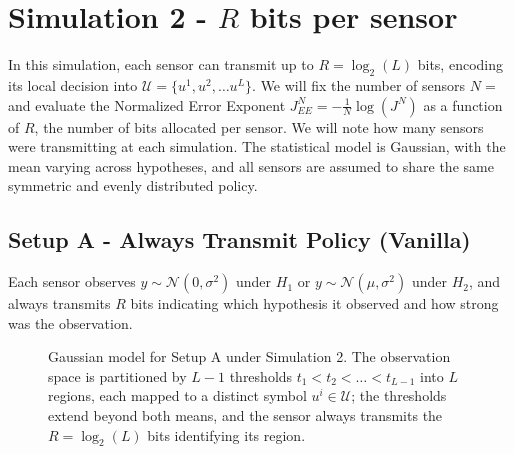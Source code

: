 \documentclass[11pt]{article}
\begin{document}
\section{Simulation 2 - $R$ bits per sensor}
In this simulation, each sensor can transmit up to $R = \log_2(L)$ bits, encoding its local decision into $\mathcal{U} = \{u^1, u^2, \dots u^L\}$.
We will fix the number of sensors $N = $ and evaluate the Normalized Error Exponent $J^N_{EE} = -\frac{1}{N}\log(J^N)$ as a function of $R$, the number of bits allocated per sensor.
We will note how many sensors were transmitting at each simulation.
The statistical model is Gaussian, with the mean varying across hypotheses, and all sensors are assumed to share the same symmetric and evenly distributed policy.

\subsection*{Setup A - Always Transmit Policy (Vanilla)}
Each sensor observes $y \sim \mathcal{N}(0,\sigma^2)$ under $H_1$ or $y \sim \mathcal{N}(\mu,\sigma^2)$ under $H_2$, and always transmits $R$ bits indicating which hypothesis it observed and how strong was the observation.

\begin{figure}[h!]
    \centering
    \caption{Gaussian model for Setup A under Simulation 2. The observation space is partitioned by $L-1$ thresholds $t_1 < t_2 < \dots < t_{L-1}$ into $L$ regions, each mapped to a distinct symbol $u^i \in \mathcal{U}$; the thresholds extend beyond both means, and the sensor always transmits the $R = \log_2(L)$ bits identifying its region.}
\end{figure}
\newpage
\end{document}
